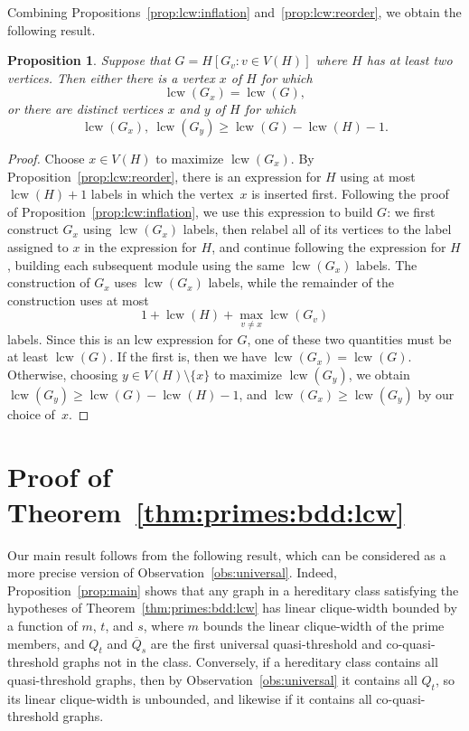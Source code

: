 \documentclass[10pt]{article}
\newcommand{\lcw}{\operatorname{lcw}}
\theoremstyle{plain}
\newtheorem{proposition}[theorem]{Proposition}
\begin{document}
Combining Propositions~\ref{prop:lcw:inflation} and~\ref{prop:lcw:reorder}, we obtain the following result.

\begin{proposition}
\label{prop:lcw:two:modules}
Suppose that $G=H[G_v : v\in V(H)]$ where $H$ has at least two vertices. Then either there is a vertex $x$ of $H$ for which
\[
	\lcw(G_x)
	=
	\lcw(G),
\]
or there are distinct vertices $x$ and $y$ of $H$ for which
\[
	\lcw(G_x),\ \lcw(G_y)
	\ge
	\lcw(G)-\lcw(H)-1.
\]
\end{proposition}
\begin{proof}
Choose $x\in V(H)$ to maximize $\lcw(G_x)$. By Proposition~\ref{prop:lcw:reorder}, there is an expression for $H$ using at most $\lcw(H)+1$ labels in which the vertex~$x$ is inserted first. Following the proof of Proposition~\ref{prop:lcw:inflation}, we use this expression to build $G$: we first construct $G_x$ using $\lcw(G_x)$ labels, then relabel all of its vertices to the label assigned to $x$ in the expression for $H$, and continue following the expression for $H$, building each subsequent module using the same $\lcw(G_x)$ labels. The construction of $G_x$ uses $\lcw(G_x)$ labels, while the remainder of the construction uses at most
\[
	1+\lcw(H)+\max_{v\neq x} \lcw(G_v)
\]
labels. Since this is an lcw expression for $G$, one of these two quantities must be at least $\lcw(G)$. If the first is, then we have $\lcw(G_x)=\lcw(G)$. Otherwise, choosing $y\in V(H)\setminus\{x\}$ to maximize $\lcw(G_y)$, we obtain $\lcw(G_y)\ge\lcw(G)-\lcw(H)-1$, and $\lcw(G_x)\ge\lcw(G_y)$ by our choice of~$x$.
\end{proof}

%
%
%
%
%

\section{Proof of Theorem~\ref{thm:primes:bdd:lcw}}

Our main result follows from the following result, which can be considered as a more precise version of Observation~\ref{obs:universal}. Indeed, Proposition~\ref{prop:main} shows that any graph in a hereditary class satisfying the hypotheses of Theorem~\ref{thm:primes:bdd:lcw} has linear clique-width bounded by a function of $m$, $t$, and $s$, where $m$ bounds the linear clique-width of the prime members, and $Q_t$ and $\overline{Q}_s$ are the first universal quasi-threshold and co-quasi-threshold graphs not in the class. Conversely, if a hereditary class contains all quasi-threshold graphs, then by Observation~\ref{obs:universal} it contains all $Q_t$, so its linear clique-width is unbounded, and likewise if it contains all co-quasi-threshold graphs.
\end{document}
